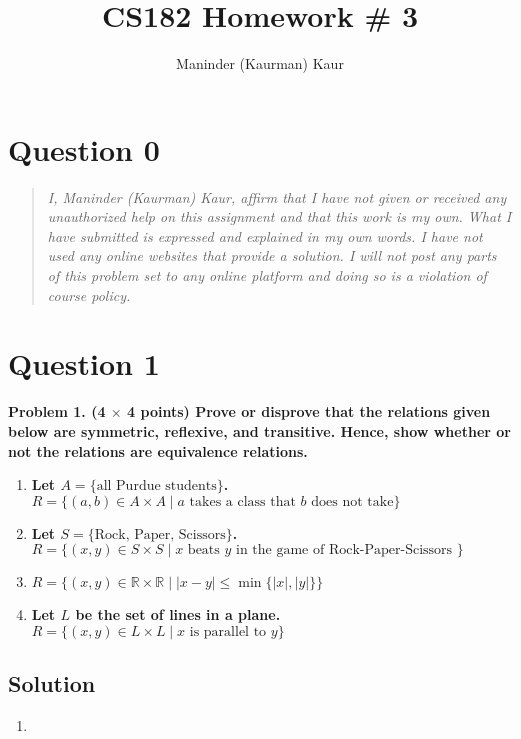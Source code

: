 \documentclass[11pt]{article}
\title{CS182 Homework \# 3}
\author{Maninder (Kaurman) Kaur}
\begin{document}
\maketitle

\section*{Question 0}
\begin{quote}
    \textit{I, Maninder (Kaurman) Kaur, affirm that I have not given or received any unauthorized help on this assignment and that this work is my own. What I have submitted is expressed and explained in my own words. I have not used any online websites that provide a solution. I will not post any parts of this problem set to any online platform and doing so is a violation of course policy.}
\end{quote}

\clearpage
\section*{Question 1}

    \textbf{Problem 1. (4 $\times$ 4 points) Prove or disprove that the relations given below are symmetric, reflexive, and transitive. Hence, show whether or not the relations are equivalence relations.}
    \begin{enumerate}[label=(\alph*)]
        \item \textbf{Let $A = \{ \text{all Purdue students} \}$. $R = \{ (a, b) \in A \times A \mid a \text{ takes a class that } b \text{ does not take} \}$}
        \item \textbf{Let $S = \{ \text{Rock, Paper, Scissors} \}$. $R = \{ (x, y) \in S \times S \mid x \text{ beats } y \text{ in the game of Rock-Paper-Scissors } \}$}
        \item \textbf{$R = \{ (x, y) \in \mathbb{R} \times \mathbb{R} \mid |x - y| \leq \min \{|x|, |y|\} \}$}
        \item \textbf{Let $L$ be the set of lines in a plane. $R = \{ (x, y) \in L \times L \mid x \text{ is parallel to } y \}$}
    \end{enumerate}

    \subsection*{Solution}
    \begin{enumerate}[label=(\alph*)]
        \item 
    \end{enumerate}
\end{document}
